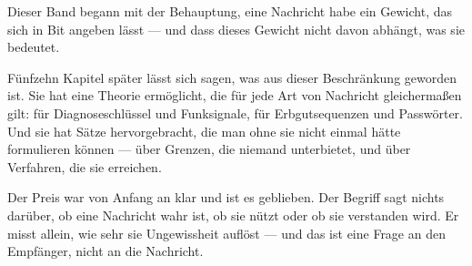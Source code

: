 \begin{merksatz}
\begin{center}
\begin{minipage}{0.9\textwidth}
Dieser Band begann mit der Behauptung, eine Nachricht habe ein Gewicht, das sich in Bit angeben lässt --- und dass dieses Gewicht nicht davon abhängt, was sie bedeutet.

Fünfzehn Kapitel später lässt sich sagen, was aus dieser Beschränkung geworden ist. Sie hat eine Theorie ermöglicht, die für jede Art von Nachricht gleichermaßen gilt: für Diagnoseschlüssel und Funksignale, für Erbgutsequenzen und Passwörter. Und sie hat Sätze hervorgebracht, die man ohne sie nicht einmal hätte formulieren können --- über Grenzen, die niemand unterbietet, und über Verfahren, die sie erreichen.

Der Preis war von Anfang an klar und ist es geblieben. Der Begriff sagt nichts darüber, ob eine Nachricht wahr ist, ob sie nützt oder ob sie verstanden wird. Er misst allein, wie sehr sie Ungewissheit auflöst --- und das ist eine Frage an den Empfänger, nicht an die Nachricht.
\end{minipage}
\end{center}

\begin{center}
\begin{minipage}{0.88\textwidth}
\end{minipage}
\end{center}

\begin{center}
\begin{minipage}{0.88\textwidth}
\end{minipage}
\end{center}
\end{merksatz}

